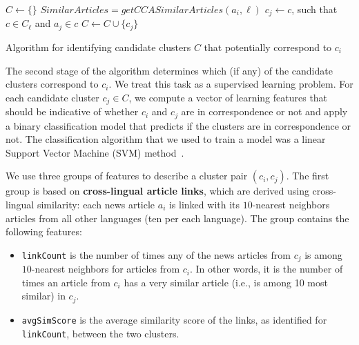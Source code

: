 \begin{algorithm}[t!]
$C \leftarrow \{\}$\;
 {
     {
        $SimilarArticles = getCCASimilarArticles(a_i, \ell)$\;
         {
            $c_j \leftarrow c$, such that $c \in C_\ell$ and $a_j \in c$\;
            $C \leftarrow C \cup \{ c_j \}$\;
        }
    }
}
\caption[Algorithm for identifying candidate clusters]{Algorithm for identifying candidate clusters $C$ that potentially correspond to $c_i$}
\label{cluster_merge_algo1}
\end{algorithm}

The second stage of the algorithm determines which (if any) of the candidate clusters correspond to $c_i$.
We treat this task as a supervised learning problem. For each candidate cluster $c_j \in C$, we compute
a vector of learning features that should be indicative of whether $c_i$ and $c_j$ are in correspondence or not
and apply a binary classification model that predicts if the clusters are in correspondence or not. The classification
algorithm that we used to train a model was a linear Support Vector Machine (SVM) method~\cite{shawe-taylor04kernel}.

We use three groups of features to describe a cluster pair $(c_i, c_j)$. The first group is based
on {\bf cross-lingual article links}, which are derived using cross-lingual similarity:
each news article $a_i$ is linked with its $10$-nearest neighbors articles from all other
languages (ten per each language). The group contains the following features:

\begin{itemize}
\item \texttt{linkCount} is the number of times any of the news articles from $c_j$ is among $10$-nearest neighbors for articles from $c_i$. In other words, it is the number of times an article from $c_i$ has a very similar article (i.e., is among 10 most similar) in $c_j$.
\item \texttt{avgSimScore} is the average similarity score of the links, as identified for \texttt{linkCount}, between the two clusters.
\end{itemize}


